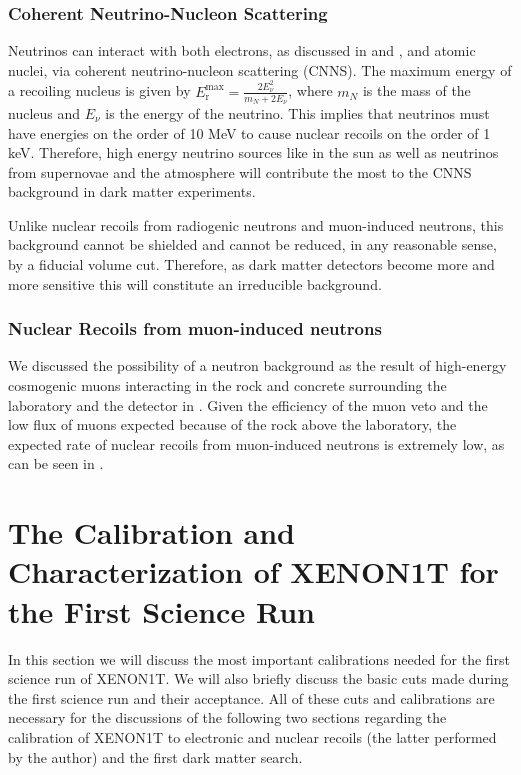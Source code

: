\subsubsection{Coherent Neutrino-Nucleon Scattering}

Neutrinos can interact with both electrons, as discussed in  and , and atomic nuclei, via coherent neutrino-nucleon scattering (CNNS).  The maximum energy of a recoiling nucleus is given by $E_{\textrm{r}}^{\textrm{max}} = \frac{2 E_{\nu}^2}{m_N + 2 E_{\nu}}$, where $m_N$ is the mass of the nucleus and $E_{\nu}$ is the energy of the neutrino.  This implies that neutrinos must have energies on the order of 10 MeV to cause nuclear recoils on the order of 1 keV.  Therefore, high energy neutrino sources like  in the sun as well as neutrinos from supernovae and the atmosphere will contribute the most to the CNNS background in dark matter experiments.

Unlike nuclear recoils from radiogenic neutrons and muon-induced neutrons, this background cannot be shielded and cannot be reduced, in any reasonable sense, by a fiducial volume cut.  Therefore, as dark matter detectors become more and more sensitive this will constitute an irreducible background.

\subsubsection{Nuclear Recoils from muon-induced neutrons}

We discussed the possibility of a neutron background as the result of high-energy cosmogenic muons interacting in the rock and concrete surrounding the laboratory and the detector in .  Given the efficiency of the muon veto and the low flux of muons expected because of the rock above the laboratory, the expected rate of nuclear recoils from muon-induced neutrons is extremely low, as can be seen in .



\section{The Calibration and Characterization of XENON1T for the First Science Run}
\label{sec:xe1t_calibrations}

In this section we will discuss the most important calibrations needed for the first science run of XENON1T.  We will also briefly discuss the basic cuts made during the first science run and their acceptance.  All of these cuts and calibrations are necessary for the discussions of the following two sections regarding the calibration of XENON1T to electronic and nuclear recoils (the latter performed by the author) and the first dark matter search.


